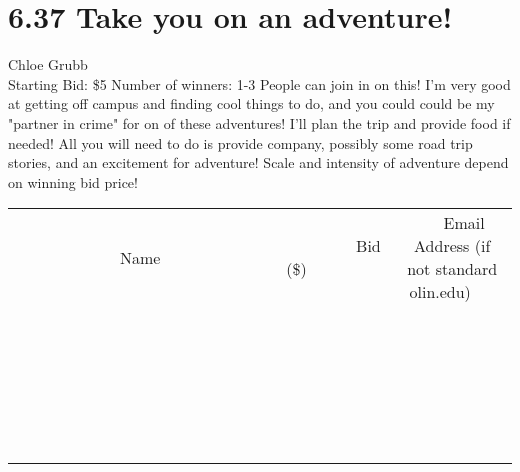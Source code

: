 \documentclass[11pt]{article}
\begin{document}
\section*{6.37 Take you on an adventure!}
Chloe Grubb
\\
Starting Bid: \$5
\newline
Number of winners: 1-3 People can join in on this!
\newline
I'm very good at getting off campus and finding cool things to do, and you could could be my "partner in crime" for on of these adventures! I'll plan the trip and provide food if needed! All you will need to do is provide company, possibly some road trip stories, and an excitement for adventure! Scale and intensity of adventure depend on winning bid price!
\\[6ex]
\begin{tabular}{c c c}
~~~~~~~~~~~~~Name~~~~~~~~~~~~~ & ~~~~~~~~~Bid (\$)~~~~~~~~~  & ~~~Email Address (if not standard olin.edu)~~~\\
 & & \\
\hline
 & & \\
\hline
 & & \\
\hline
 & & \\
\hline
 & & \\
\hline
 & & \\
\hline
 & & \\
\hline
 & & \\
\hline
 & & \\
\hline
 & & \\
\hline
 & & \\
\hline
 & & \\
\hline
 & & \\
\hline
 & & \\
\hline
 & & \\
\hline
 & & \\
\hline
 & & \\
\hline
 & & \\
\hline
 & & \\
\hline
 & & \\
\hline
 & & \\
\hline
 & & \\
\hline
 & & \\
\hline
 & & \\
\hline
 & & \\
\hline
 & & \\
\hline
\end{tabular}
\newpage
\end{document}
